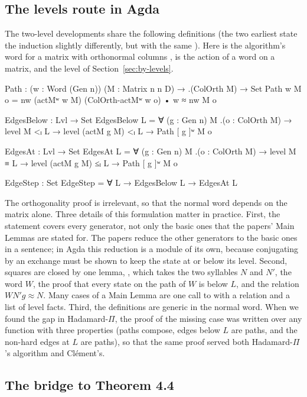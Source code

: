 \subsection{The levels route in Agda}\label{sec:levels-details}

The two-level developments share the following definitions (the two
earliest state the induction slightly differently, but with the same
). Here  is the algorithm's word for
a matrix  with orthonormal columns ,  is the
action of a word on a matrix, and  the level of
Section~\ref{sec:by-levels}.
\begin{agdacode}
Path : (w : Word (Gen n)) (M : Matrix n n D) → .(ColOrth M) → Set
Path w M o = nw (actMʷ w M) (ColOrth-actMʷ w o) • w ≈ nw M o

EdgesBelow : Lvl → Set
EdgesBelow L = ∀ (g : Gen n) M .(o : ColOrth M) →
  level M <ₗ L → level (actM g M) <ₗ L → Path [ g ]ʷ M o

EdgesAt : Lvl → Set
EdgesAt L = ∀ (g : Gen n) M .(o : ColOrth M) →
  level M ≡ L → level (actM g M) ≤ₗ L → Path [ g ]ʷ M o

EdgeStep : Set
EdgeStep = ∀ L → EdgesBelow L → EdgesAt L
\end{agdacode}
The orthogonality proof  is irrelevant, so that the normal word
depends on the matrix alone. Three details of this formulation matter
in practice. First, the statement covers every generator, not only the
basic ones that the papers' Main Lemmas are stated for. The papers
reduce the other generators to the basic ones in a sentence; in Agda
this reduction is a module of its own, because conjugating by an
exchange must be shown to keep the state at or below its level. Second,
squares are closed by one lemma, , which takes the two
syllables $N$ and $N'$, the word $W$, the proof that every state on the
path of $W$ is below $L$, and the relation $W N' g \approx N$. Many
cases of a Main Lemma are one call to  with a relation and a
list of level facts. Third, the definitions are generic in the normal
word. When we found the gap in Hadamard-$\Pi$, the proof of the missing
case was written over any function  with three properties
(paths compose, edges below $L$ are paths, and the non-hard edges at
$L$ are paths), so that the same proof served both Hadamard-$\Pi$'s
algorithm and Cl\'ement's.

\subsection{The bridge to Theorem 4.4}\label{sec:bridge-details}

